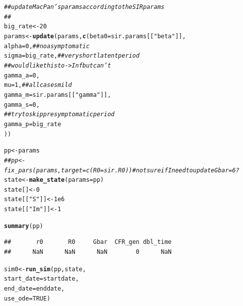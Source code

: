 \documentclass{article}\usepackage[]{graphicx}\usepackage[]{color}
\makeatletter
\newcommand{\hlnum}[1]{\textcolor[rgb]{0.686,0.059,0.569}{#1}}%
\newcommand{\hlstr}[1]{\textcolor[rgb]{0.192,0.494,0.8}{#1}}%
\newcommand{\hlcom}[1]{\textcolor[rgb]{0.678,0.584,0.686}{\textit{#1}}}%
\newcommand{\hlstd}[1]{\textcolor[rgb]{0.345,0.345,0.345}{#1}}%
\newcommand{\hlkwb}[1]{\textcolor[rgb]{0.69,0.353,0.396}{#1}}%
\newcommand{\hlkwc}[1]{\textcolor[rgb]{0.333,0.667,0.333}{#1}}%
\newcommand{\hlkwd}[1]{\textcolor[rgb]{0.737,0.353,0.396}{\textbf{#1}}}%
\newenvironment{kframe}{%
 \def\at@end@of@kframe{}%
 \ifinner\ifhmode%
  \def\at@end@of@kframe{\end{minipage}}%
  \begin{minipage}{\columnwidth}%
 \fi\fi%
 \def\FrameCommand##1{\hskip\@totalleftmargin \hskip-\fboxsep
 \colorbox{shadecolor}{##1}\hskip-\fboxsep
     \hskip-\linewidth \hskip-\@totalleftmargin \hskip\columnwidth}%
 \MakeFramed {\advance\hsize-\width
   \@totalleftmargin\z@ \linewidth\hsize
   \@setminipage}}%
 {\par\unskip\endMakeFramed%
 \at@end@of@kframe}
\newenvironment{knitrout}{}{} %
\makeatother
\begin{document}
\begin{knitrout}
\color{fgcolor}\begin{kframe}
\begin{alltt}
\hlcom{## update MacPan's params according to the SIR params}
\hlcom{##}
\hlstd{big_rate} \hlkwb{<-} \hlnum{20}
\hlstd{params} \hlkwb{<-} \hlkwd{update}\hlstd{(params,} \hlkwd{c}\hlstd{(}\hlkwc{beta0}\hlstd{=sir.params[[}\hlstr{"beta"}\hlstd{]],}
                           \hlkwc{alpha}\hlstd{=}\hlnum{0}\hlstd{,} \hlcom{## no asymptomatic}
                           \hlkwc{sigma}\hlstd{=big_rate,} \hlcom{## very short latent period}
                           \hlcom{## would like this to -> Inf but can't}
                           \hlkwc{gamma_a}\hlstd{=}\hlnum{0}\hlstd{,}
                           \hlkwc{mu}\hlstd{=}\hlnum{1}\hlstd{,}  \hlcom{## all cases mild}
                           \hlkwc{gamma_m}\hlstd{=sir.params[[}\hlstr{"gamma"}\hlstd{]],}
                           \hlkwc{gamma_s}\hlstd{=}\hlnum{0}\hlstd{,}
                           \hlcom{## try to skip presymptomatic period}
                           \hlkwc{gamma_p}\hlstd{=big_rate}
                           \hlstd{))}

\hlstd{pp} \hlkwb{<-} \hlstd{params}
\hlcom{## pp <- fix_pars(params, target = c(R0 = sir.R0)) #not sure if I need to update Gbar=6?}
\hlstd{state} \hlkwb{<-} \hlkwd{make_state}\hlstd{(}\hlkwc{params}\hlstd{=pp)}
\hlstd{state[]} \hlkwb{<-} \hlnum{0}
\hlstd{state[[}\hlstr{"S"}\hlstd{]]} \hlkwb{<-} \hlnum{1e6}
\hlstd{state[[}\hlstr{"Im"}\hlstd{]]} \hlkwb{<-} \hlnum{1}

\hlkwd{summary}\hlstd{(pp)}
\end{alltt}


{\ttfamily\noindent\color{warningcolor}{\#\# Warning in log(r\_last/r\_nextlast): NaNs produced}}\begin{verbatim}
##       r0       R0     Gbar  CFR_gen dbl_time 
##      NaN      NaN      NaN        0      NaN
\end{verbatim}
\begin{alltt}
\hlstd{sim0} \hlkwb{<-} \hlkwd{run_sim}\hlstd{(pp,state,}
                \hlkwc{start_date}\hlstd{=startdate,}
                \hlkwc{end_date}\hlstd{=enddate,}
                \hlkwc{use_ode}\hlstd{=}\hlnum{TRUE}\hlstd{)}


\end{alltt}
\end{kframe}
\end{knitrout}
\end{document}
